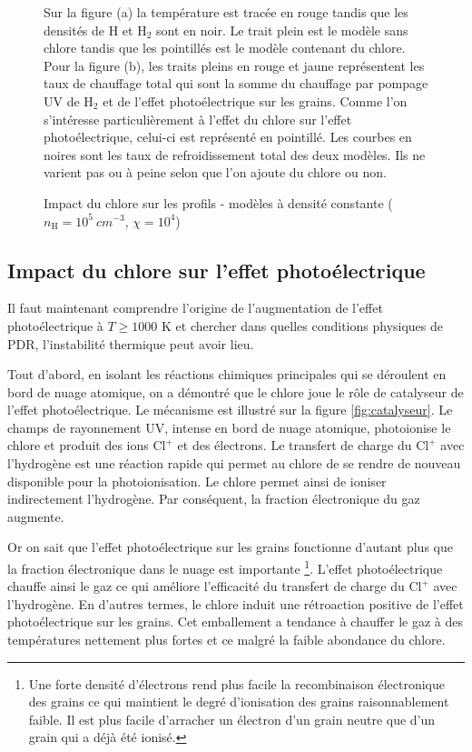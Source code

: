\begin{figure}[!h]
\begin{subfigure}[t]{0.45\textwidth}
    \end{subfigure}
    \caption{Impact du chlore sur les profils - modèles à densité constante ($n_{\mathrm{H}} = 10^5\ cm^{-3}$, $\chi = 10^4$)}
    \begin{minipage}{\textwidth}
    Sur la figure (a) la température est tracée en rouge tandis que les densités de $\mathrm{H}$ et $\mathrm{H}_2$ sont en noir. Le trait plein est le modèle sans chlore tandis que les pointillés est le modèle contenant du chlore. Pour la figure (b), les traits pleins en rouge et jaune représentent les taux de chauffage total qui sont la somme du chauffage par pompage UV de $\mathrm{H}_2$ et de l'effet photoélectrique sur les grains. Comme l'on s'intéresse particulièrement à l'effet du chlore sur l'effet photoélectrique, celui-ci est représenté en pointillé. Les courbes en noires sont les taux de refroidissement total des deux modèles. Ils ne varient pas ou à peine selon que l'on ajoute du chlore ou non.
    \end{minipage}
\end{figure}


\subsection{Impact du chlore sur l'effet photoélectrique}

Il faut maintenant comprendre l'origine de l'augmentation de l'effet photoélectrique à $T\geq 1000$ K  et chercher dans quelles conditions physiques de PDR, l'instabilité thermique peut avoir lieu. \newline 

Tout d'abord, en isolant les réactions chimiques principales qui se déroulent en bord de nuage atomique, on a démontré que le chlore joue le rôle de catalyseur de l'effet photoélectrique. Le mécanisme est illustré sur la figure \ref{fig:catalyseur}.
Le champs de rayonnement UV, intense en bord de nuage atomique, photoionise le chlore et produit des ions $\mathrm{Cl}^+$ et des électrons. Le transfert de charge du $\mathrm{Cl}^+$ avec l'hydrogène est une réaction rapide qui permet au chlore de se rendre de nouveau disponible pour la photoionisation. Le chlore permet ainsi de ioniser indirectement l'hydrogène. Par conséquent, la fraction électronique du gaz augmente.  \newline 

Or on sait que l'effet photoélectrique sur les grains fonctionne d'autant plus que la fraction électronique dans le nuage est importante \footnote{Une forte densité d'électrons rend plus facile la recombinaison électronique des grains ce qui maintient le degré d'ionisation des grains raisonnablement faible. Il est plus facile d'arracher un électron d'un grain neutre que d'un grain qui a déjà été ionisé.}. 
L'effet photoélectrique chauffe ainsi le gaz ce qui améliore l'efficacité du transfert de charge du $\mathrm{Cl}^+$ avec l'hydrogène. 
En d'autres termes, le chlore induit une rétroaction positive de l'effet photoélectrique sur les grains. Cet emballement a tendance à chauffer le gaz à des températures nettement plus fortes et ce malgré la faible abondance du chlore. \newline


